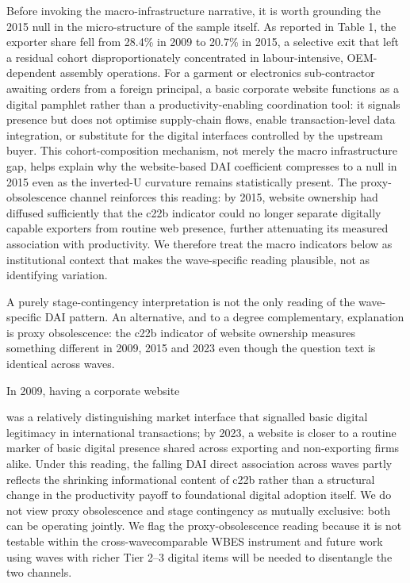 \documentclass[12pt,a4paper]{article}
\begin{document}
Before invoking the macro-infrastructure narrative, it is worth
grounding the 2015 null in the micro-structure of the sample itself. As
reported in Table 1, the exporter share fell from 28.4\% in 2009 to
20.7\% in 2015, a selective exit that left a residual cohort
disproportionately concentrated in labour-intensive, OEM-dependent
assembly operations. For a garment or electronics sub-contractor
awaiting orders from a foreign principal, a basic corporate website
functions as a digital pamphlet rather than a productivity-enabling
coordination tool: it signals presence but does not optimise
supply-chain flows, enable transaction-level data integration, or
substitute for the digital interfaces controlled by the upstream buyer.
This cohort-composition mechanism, not merely the macro infrastructure
gap, helps explain why the website-based DAI coefficient compresses to a
null in 2015 even as the inverted-U curvature remains statistically
present. The proxy-obsolescence channel reinforces this reading: by
2015, website ownership had diffused sufficiently that the c22b
indicator could no longer separate digitally capable exporters from
routine web presence, further attenuating its measured association with
productivity. We therefore treat the macro indicators below as
institutional context that makes the wave-specific reading plausible,
not as identifying variation.

A purely stage-contingency interpretation is not the only reading of the
wave-specific DAI pattern. An alternative, and to a degree
complementary, explanation is proxy obsolescence: the c22b indicator of
website ownership measures something different in 2009, 2015 and 2023
even though the question text is identical across waves.

In 2009, having a corporate website

was a relatively distinguishing market interface that signalled basic
digital legitimacy in international transactions; by 2023, a website is
closer to a routine marker of basic digital presence shared across
exporting and non-exporting firms alike. Under this reading, the falling
DAI direct association across waves partly reflects the shrinking
informational content of c22b rather than a structural change in the
productivity payoff to foundational digital adoption itself. We do not
view proxy obsolescence and stage contingency as mutually exclusive:
both can be operating jointly. We flag the proxy-obsolescence reading
because it is not testable within the cross-wavecomparable WBES
instrument and future work using waves with richer Tier 2--3 digital
items will be needed to disentangle the two channels.
\end{document}
